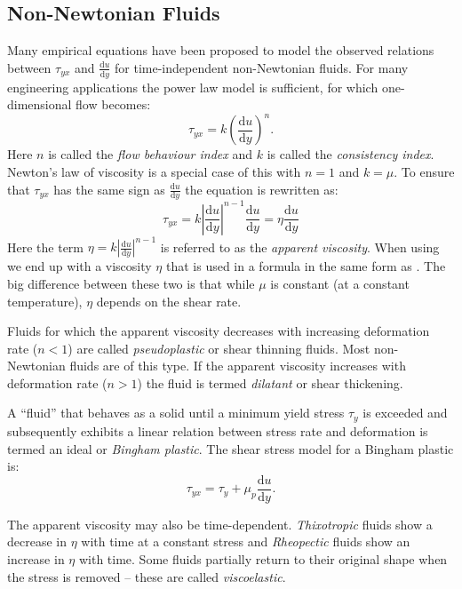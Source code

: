 \subsection{Non-Newtonian Fluids}
Many empirical equations have been proposed to model the observed relations between $\tau_{yx}$ and $\frac{\mathrm{d}u}{\mathrm{d}y} $ for time-independent non-Newtonian fluids. For many engineering applications the power law model is sufficient, for which one-dimensional flow becomes:
\[ 
\tau_{yx} = k \left( \frac{\mathrm{d}u}{\mathrm{d}y}  \right)^{n}
.\]
Here $n$ is called the \textit{flow behaviour index} and $k$ is called the \textit{consistency index}. Newton's law of viscosity is a special case of this with $n = 1$ and $k = \mu$. To ensure that $\tau_{yx}$ has the same sign as $\frac{\mathrm{d}u}{\mathrm{d}y} $ the equation is rewritten as:
\begin{equation} \label{eq:nonnewvisone}
  \tau_{yx} = k \left| \frac{\mathrm{d}u}{\mathrm{d}y}  \right|^{n-1} \frac{\mathrm{d}u}{\mathrm{d}y} = \eta \frac{\mathrm{d}u}{\mathrm{d}y} 
\end{equation}
Here the term $\eta = k \left| \frac{\mathrm{d}u}{\mathrm{d}y}  \right|^{n-1}$ is referred to as the \textit{apparent viscosity}. When using  we end up with a viscosity $\eta$ that is used in a formula in the same form as . The big difference between these two is that while $\mu$ is constant (at a constant temperature), $\eta$ depends on the shear rate.

Fluids for which the apparent viscosity decreases with increasing deformation rate ($n<1$) are called \textit{pseudoplastic} or shear thinning fluids. Most non-Newtonian fluids are of this type. If the apparent viscosity increases with deformation rate ($n>1$) the fluid is termed \textit{dilatant} or shear thickening.

A ``fluid'' that behaves as a solid until a minimum yield stress $\tau_y$ is exceeded and subsequently exhibits a linear relation between stress rate and deformation is termed an ideal or \textit{Bingham plastic}. The shear stress model for a Bingham plastic is:
\[ 
\tau_{yx} = \tau_y + \mu_p \frac{\mathrm{d}u}{\mathrm{d}y} 
.\]

The apparent viscosity may also be time-dependent. \textit{Thixotropic} fluids show a decrease in $\eta$ with time at a constant stress and \textit{Rheopectic} fluids show an increase in $\eta$ with time. Some fluids partially return to their original shape when the stress is removed -- these are called \textit{viscoelastic}.

